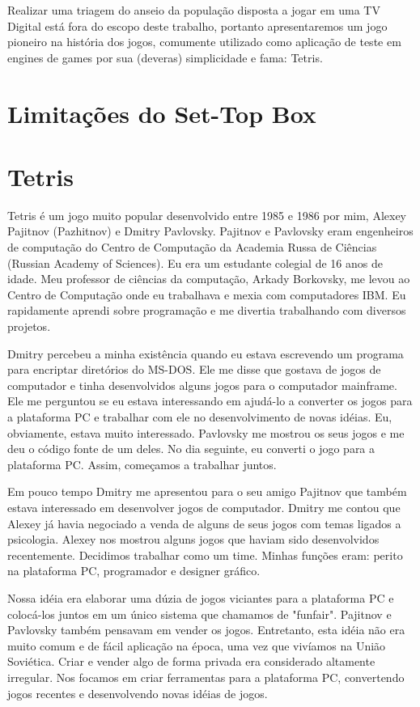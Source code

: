 \documentclass[
	12pt,				%
	openright,			%
	oneside,			%
	a4paper,			%
	brazil,				%
	]{abntex2}
\begin{document}
Realizar uma triagem do anseio da população disposta a jogar em uma TV Digital está fora do escopo deste trabalho, portanto apresentaremos um jogo pioneiro na história dos jogos, comumente utilizado como aplicação de teste em engines de games por sua (deveras) simplicidade e fama: Tetris.

\section{Limitações do Set-Top Box}



\section{Tetris}

Tetris é um jogo muito popular desenvolvido entre 1985 e 1986 por mim, Alexey Pajitnov (Pazhitnov) e Dmitry Pavlovsky. Pajitnov e Pavlovsky eram engenheiros de computação do Centro de Computação da Academia Russa de Ciências (Russian Academy of Sciences). Eu era um estudante colegial de 16 anos de idade. Meu professor de ciências da computação, Arkady Borkovsky, me levou ao Centro de Computação onde eu trabalhava e mexia com computadores IBM. Eu rapidamente aprendi sobre programação e me divertia trabalhando com diversos projetos.

Dmitry percebeu a minha existência quando eu estava escrevendo um programa para encriptar diretórios do MS-DOS. Ele me disse que gostava de jogos de computador e tinha desenvolvidos alguns jogos para o computador mainframe. Ele me perguntou se eu estava interessando em ajudá-lo a converter os jogos para a plataforma PC e trabalhar com ele no desenvolvimento de novas idéias. Eu, obviamente, estava muito interessado. Pavlovsky me mostrou os seus jogos e me deu o código fonte de um deles. No dia seguinte, eu converti o jogo para a plataforma PC. Assim, começamos a trabalhar juntos.

Em pouco tempo Dmitry me apresentou para o seu amigo Pajitnov que também estava interessado em desenvolver jogos de computador. Dmitry me contou que Alexey já havia negociado a venda de alguns de seus jogos com temas ligados a psicologia. Alexey nos mostrou alguns jogos que haviam sido desenvolvidos recentemente. Decidimos trabalhar como um time. Minhas funções eram: perito na plataforma PC, programador e designer gráfico.

Nossa idéia era elaborar uma dúzia de jogos viciantes para a plataforma PC e colocá-los juntos em um único sistema que chamamos de "funfair". Pajitnov e Pavlovsky também pensavam em vender os jogos. Entretanto, esta idéia não era muito comum e de fácil aplicação na época, uma vez que vivíamos na União Soviética. Criar e vender algo de forma privada era considerado altamente irregular. Nos focamos em criar ferramentas para a plataforma PC, convertendo jogos recentes e desenvolvendo novas idéias de jogos.
\end{document}
